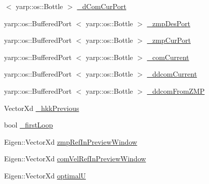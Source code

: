 \begin{DoxyCompactItemize}
$<$ yarp\-::os\-::\-Bottle $>$ \hyperlink{classWalkingClient_a1fbc9d7f1e967f24acda745028f865df}{\-\_\-d\-Com\-Cur\-Port}
\item 
yarp\-::os\-::\-Buffered\-Port\*
$<$ yarp\-::os\-::\-Bottle $>$ \hyperlink{classWalkingClient_acbac3e142471448b50dd605e4217b0d0}{\-\_\-zmp\-Des\-Port}
\item 
yarp\-::os\-::\-Buffered\-Port\*
$<$ yarp\-::os\-::\-Bottle $>$ \hyperlink{classWalkingClient_a546e6830e43d19ba7d8a8e808e28ef53}{\-\_\-zmp\-Cur\-Port}
\item 
yarp\-::os\-::\-Buffered\-Port\*
$<$ yarp\-::os\-::\-Bottle $>$ \hyperlink{classWalkingClient_a199a104e0d4d52deae07d88d8229b60d}{\-\_\-com\-Current}
\item 
yarp\-::os\-::\-Buffered\-Port\*
$<$ yarp\-::os\-::\-Bottle $>$ \hyperlink{classWalkingClient_a692d95b3e76a396d107b0c29a3d591f1}{\-\_\-ddcom\-Current}
\item 
yarp\-::os\-::\-Buffered\-Port\*
$<$ yarp\-::os\-::\-Bottle $>$ \hyperlink{classWalkingClient_a41b7320607812418af496b8b2c30204f}{\-\_\-ddcom\-From\-Z\-M\-P}
\item 
\-Vector\-Xd \hyperlink{classWalkingClient_abc3c504305c00a27e9fd38a8bf08ecda}{\-\_\-hkk\-Previous}
\item 
bool \hyperlink{classWalkingClient_ab645ecb2d55e28b57a64ca48ee638b1e}{\-\_\-first\-Loop}
\item 
\-Eigen\-::\-Vector\-Xd \hyperlink{classWalkingClient_af28b3cd3b1202f83e193b098572fbdd3}{zmp\-Ref\-In\-Preview\-Window}
\item 
\-Eigen\-::\-Vector\-Xd \hyperlink{classWalkingClient_ab3b1defedb6d79b5b6eaadd52bbad9f5}{com\-Vel\-Ref\-In\-Preview\-Window}
\item 
\-Eigen\-::\-Vector\-Xd \hyperlink{classWalkingClient_a0e5aee88e377029d79f57e778c583f18}{optimal\-U}
\end{DoxyCompactItemize}


